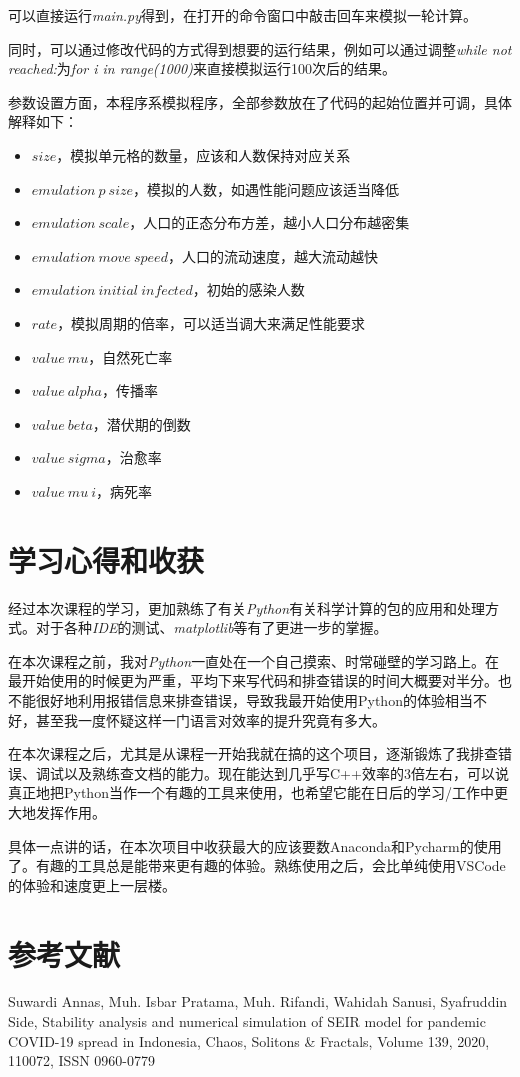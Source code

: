 \documentclass[a4paper]{ltxdoc}
\begin{document}
可以直接运行\textit{main.py}得到，在打开的命令窗口中敲击回车来模拟一轮计算。

同时，可以通过修改代码的方式得到想要的运行结果，例如可以通过调整\textit{while not reached:}为\textit{for i in range(1000)}来直接模拟运行100次后的结果。

参数设置方面，本程序系模拟程序，全部参数放在了代码的起始位置并可调，具体解释如下：

\begin{itemize}
    \item $size$，模拟单元格的数量，应该和人数保持对应关系
    \item $emulation\ p\ size$，模拟的人数，如遇性能问题应该适当降低
    \item $emulation\ scale$，人口的正态分布方差，越小人口分布越密集
    \item $emulation\ move\ speed$，人口的流动速度，越大流动越快
    \item $emulation\ initial\ infected$，初始的感染人数
    \item $rate$，模拟周期的倍率，可以适当调大来满足性能要求
    \item $value\ mu$，自然死亡率
    \item $value\ alpha$，传播率
    \item $value\ beta$，潜伏期的倒数
    \item $value\ sigma$，治愈率
    \item $value\ mu\  i$，病死率
\end{itemize}

\section{学习心得和收获}

经过本次课程的学习，更加熟练了有关\textit{Python}有关科学计算的包的应用和处理方式。对于各种\textit{IDE}的测试、\textit{matplotlib}等有了更进一步的掌握。

在本次课程之前，我对\textit{Python}一直处在一个自己摸索、时常碰壁的学习路上。在最开始使用的时候更为严重，平均下来写代码和排查错误的时间大概要对半分。也不能很好地利用报错信息来排查错误，导致我最开始使用Python的体验相当不好，甚至我一度怀疑这样一门语言对效率的提升究竟有多大。

在本次课程之后，尤其是从课程一开始我就在搞的这个项目，逐渐锻炼了我排查错误、调试以及熟练查文档的能力。现在能达到几乎写C++效率的3倍左右，可以说真正地把Python当作一个有趣的工具来使用，也希望它能在日后的学习/工作中更大地发挥作用。

具体一点讲的话，在本次项目中收获最大的应该要数Anaconda和Pycharm的使用了。有趣的工具总是能带来更有趣的体验。熟练使用之后，会比单纯使用VSCode的体验和速度更上一层楼。

\section{参考文献}

Suwardi Annas, Muh. Isbar Pratama, Muh. Rifandi, Wahidah Sanusi, Syafruddin Side, Stability analysis and numerical simulation of SEIR model for pandemic COVID-19 spread in Indonesia, Chaos, Solitons \& Fractals, Volume 139, 2020, 110072, ISSN 0960-0779
\end{document}

